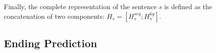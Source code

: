 Finally, the complete representation of the sentence $s$ is defined as
the concatenation of two components: $H_s=[H_s^{seq}; H_s^{kg}]$.

%
%

\subsection{Ending Prediction}
\label{sec:classifier}

